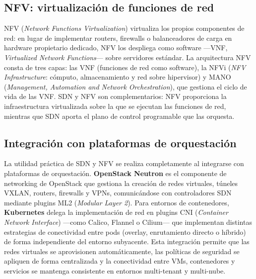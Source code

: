 \subsection{NFV: virtualización de funciones de red}

NFV (\textit{Network Functions Virtualization}) virtualiza los propios componentes de red: en lugar de implementar routers, firewalls o balanceadores de carga en hardware propietario dedicado, NFV los despliega como software —VNF, \textit{Virtualized Network Functions}— sobre servidores estándar. La arquitectura NFV consta de tres capas: las VNF (funciones de red como software), la NFVi (\textit{NFV Infrastructure}: cómputo, almacenamiento y red sobre hipervisor) y MANO (\textit{Management, Automation and Network Orchestration}), que gestiona el ciclo de vida de las VNF. SDN y NFV son complementarios: NFV proporciona la infraestructura virtualizada sobre la que se ejecutan las funciones de red, mientras que SDN aporta el plano de control programable que las orquesta.

\subsection{Integración con plataformas de orquestación}

La utilidad práctica de SDN y NFV se realiza completamente al integrarse con plataformas de orquestación. \textbf{OpenStack Neutron} es el componente de networking de OpenStack que gestiona la creación de redes virtuales, túneles VXLAN, routers, firewalls y VPNs, comunicándose con controladores SDN mediante plugins ML2 (\textit{Modular Layer 2}). Para entornos de contenedores, \textbf{Kubernetes} delega la implementación de red en plugins CNI (\textit{Container Network Interface}) —como Calico, Flannel o Cilium— que implementan distintas estrategias de conectividad entre pods (overlay, enrutamiento directo o híbrido) de forma independiente del entorno subyacente. Esta integración permite que las redes virtuales se aprovisionen automáticamente, las políticas de seguridad se apliquen de forma centralizada y la conectividad entre VMs, contenedores y servicios se mantenga consistente en entornos multi-tenant y multi-nube.
